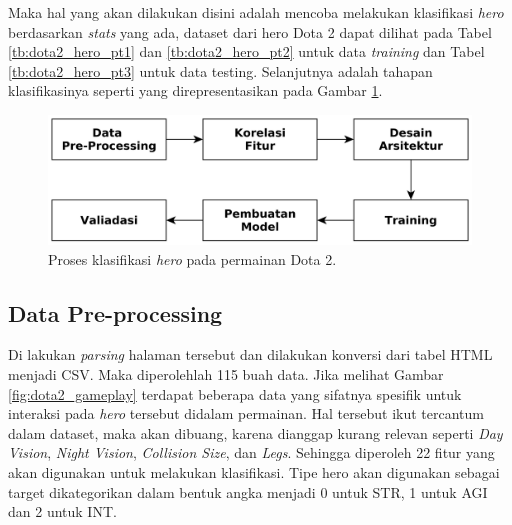Maka hal yang akan dilakukan disini adalah mencoba melakukan klasifikasi \textit{hero} berdasarkan \textit{stats} yang ada, dataset dari hero Dota 2 dapat dilihat pada Tabel \ref{tb:dota2_hero_pt1} dan \ref{tb:dota2_hero_pt2} untuk data \textit{training} dan Tabel \ref{tb:dota2_hero_pt3} untuk data testing. Selanjutnya adalah tahapan klasifikasinya seperti yang direpresentasikan pada Gambar \ref{fig:dota2_class_proc}.
\vspace{1ex}

\begin{figure} [!h] \centering
	\includegraphics[scale=0.032]{img/dota2_nn_classification.png}
	\caption{Proses klasifikasi \textit{hero} pada permainan Dota 2.}
	\label{fig:dota2_class_proc}
\end{figure}

\subsection{Data Pre-processing}
\label{sec:sub_sec3_dota2_pre_proc}
\vspace{1ex}

Di lakukan \textit{parsing} halaman tersebut \citep{dota2020} dan dilakukan konversi dari tabel HTML menjadi CSV. Maka diperolehlah 115 buah data. Jika melihat Gambar \ref{fig:dota2_gameplay} terdapat beberapa data yang sifatnya spesifik untuk interaksi pada \textit{hero} tersebut didalam permainan. Hal tersebut ikut tercantum dalam dataset, maka akan dibuang, karena dianggap kurang relevan seperti \textit{Day Vision}, \textit{Night Vision}, \textit{Collision Size}, dan \textit{Legs}. Sehingga diperoleh 22 fitur yang akan digunakan untuk melakukan klasifikasi. Tipe hero akan digunakan sebagai target dikategorikan dalam bentuk angka menjadi 0 untuk STR, 1 untuk AGI dan 2 untuk INT.
\vspace{1ex}

